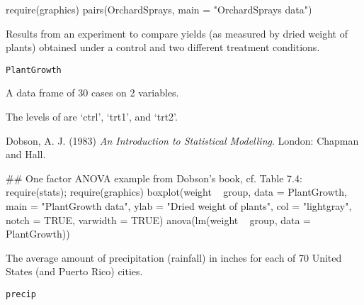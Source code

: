 %
\begin{Examples}
\begin{ExampleCode}
require(graphics)
pairs(OrchardSprays, main = "OrchardSprays data")
\end{ExampleCode}
\end{Examples}
%
\begin{Description}\relax
Results from an experiment to compare yields (as measured by dried
weight of plants) obtained under a control and two different treatment
conditions.
\end{Description}
%
\begin{Usage}
\begin{verbatim}
PlantGrowth
\end{verbatim}
\end{Usage}
%
\begin{Format}
A data frame of 30 cases on 2 variables.



The levels of  are `ctrl', `trt1', and `trt2'.
\end{Format}
%
\begin{Source}\relax
Dobson, A. J. (1983)
\emph{An Introduction to Statistical Modelling}.
London: Chapman and Hall.
\end{Source}
%
\begin{Examples}
\begin{ExampleCode}
## One factor ANOVA example from Dobson's book, cf. Table 7.4:
require(stats); require(graphics)
boxplot(weight ~ group, data = PlantGrowth, main = "PlantGrowth data",
        ylab = "Dried weight of plants", col = "lightgray",
        notch = TRUE, varwidth = TRUE)
anova(lm(weight ~ group, data = PlantGrowth))
\end{ExampleCode}
\end{Examples}
%
\begin{Description}\relax
The average amount of precipitation (rainfall) in inches for each of
70 United States (and Puerto Rico) cities.
\end{Description}
%
\begin{Usage}
\begin{verbatim}
precip
\end{verbatim}
\end{Usage}

